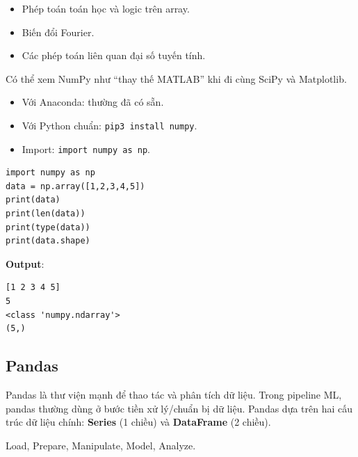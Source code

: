 \begin{phuongphap}[title={Các phép toán quan trọng}]
\begin{itemize}
  \item Phép toán toán học và logic trên array.
  \item Biến đổi Fourier.
  \item Các phép toán liên quan đại số tuyến tính.
\end{itemize}
\end{phuongphap}

\begin{luuy}[title={So sánh trực giác}]
Có thể xem NumPy như “thay thế MATLAB” khi đi cùng SciPy và Matplotlib.
\end{luuy}

\begin{phuongphap}[title={Cài đặt và import}]
\begin{itemize}
  \item Với Anaconda: thường đã có sẵn.
  \item Với Python chuẩn: \texttt{pip3 install numpy}.
  \item Import: \texttt{import numpy as np}.
\end{itemize}
\end{phuongphap}

\begin{vidu}[title={Ví dụ: tạo array 1 chiều}]
\begin{lstlisting}
import numpy as np
data = np.array([1,2,3,4,5])
print(data)
print(len(data))
print(type(data))
print(data.shape)
\end{lstlisting}

\textbf{Output}:
\begin{lstlisting}
[1 2 3 4 5]
5
<class 'numpy.ndarray'>
(5,)
\end{lstlisting}
\end{vidu}

\subsection{Pandas}

\begin{dinhnghia}[title={Pandas}]
Pandas là thư viện mạnh để thao tác và phân tích dữ liệu.
Trong pipeline ML, pandas thường dùng ở bước tiền xử lý/chuẩn bị dữ liệu.
Pandas dựa trên hai cấu trúc dữ liệu chính: \textbf{Series} (1 chiều) và \textbf{DataFrame} (2 chiều).
\end{dinhnghia}

\begin{phuongphap}[title={5 bước xử lý dữ liệu}]
Load, Prepare, Manipulate, Model, Analyze.
\end{phuongphap}

